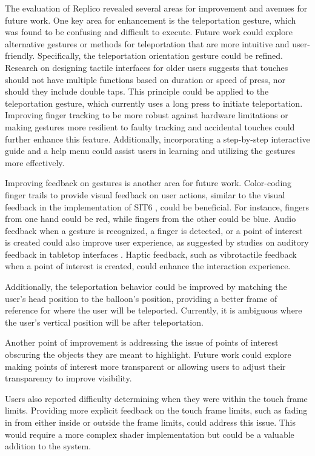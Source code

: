     The evaluation of Replico revealed several areas for improvement and avenues for future work. One key area for enhancement is the teleportation gesture, which was found to be confusing and difficult to execute. Future work could explore alternative gestures or methods for teleportation that are more intuitive and user-friendly. Specifically, the teleportation orientation gesture could be refined. Research on designing tactile interfaces for older users suggests that touches should not have multiple functions based on duration or speed of press, nor should they include double taps. This principle could be applied to the teleportation gesture, which currently uses a long press to initiate teleportation. Improving finger tracking to be more robust against hardware limitations or making gestures more resilient to faulty tracking and accidental touches could further enhance this feature. Additionally, incorporating a step-by-step interactive guide and a help menu could assist users in learning and utilizing the gestures more effectively.

    Improving feedback on gestures is another area for future work. Color-coding finger trails to provide visual feedback on user actions, similar to the visual feedback in the implementation of SIT6 \cite{almeidaSIT6IndirectTouchbased2023}, could be beneficial. For instance, fingers from one hand could be red, while fingers from the other could be blue. Audio feedback when a gesture is recognized, a finger is detected, or a point of interest is created could also improve user experience, as suggested by studies on auditory feedback in tabletop interfaces \cite{auditoryAwareness}. Haptic feedback, such as vibrotactile feedback when a point of interest is created, could enhance the interaction experience.

    Additionally, the teleportation behavior could be improved by matching the user's head position to the balloon's position, providing a better frame of reference for where the user will be teleported. Currently, it is ambiguous where the user's vertical position will be after teleportation.

    Another point of improvement is addressing the issue of points of interest obscuring the objects they are meant to highlight. Future work could explore making points of interest more transparent or allowing users to adjust their transparency to improve visibility.

    Users also reported difficulty determining when they were within the touch frame limits. Providing more explicit feedback on the touch frame limits, such as fading in from either inside or outside the frame limits, could address this issue. This would require a more complex shader implementation but could be a valuable addition to the system.

